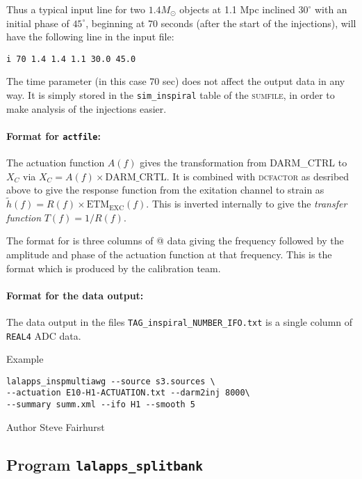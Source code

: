 \begin{entry}
Thus a typical input line for two $1.4M_\odot$ objects at 1.1 Mpc
inclined $30^\circ$ with an initial phase of $45^\circ$, beginning at
70 seconds (after the start of the injections), will have the following line in the input
file:
\begin{verbatim}
i 70 1.4 1.4 1.1 30.0 45.0
\end{verbatim}
The time parameter (in this case 70 sec) does not affect the output data in any
way.  It is simply stored in the \texttt{sim\_inspiral} table of the
\textsc{sumfile}, in order to make analysis of the injections easier.

\paragraph{Format for \texttt{actfile}:} The actuation function $A(f)$
gives the transformation from DARM\_CTRL to $X_{C}$ via $X_{C} = A(f) 
\times \mathrm{DARM}\_\mathrm{CRTL}$.   It is combined with
\textsc{dcfactor} as desribed above to give the response function from
the exitation channel to strain as
$\tilde{h}(f)=R(f) \times \mathrm{ETM}_\mathrm{EXC}(f)$.  This is inverted internally 
to give the \emph{transfer function} $T(f)=1/R(f)$. 

The format for \verb@actfile@ is three columns of @ data giving the 
frequency followed by the amplitude and phase of the actuation function
at that frequency.  This is the format which is produced by the
calibration team.

\paragraph{Format for the data output:} The data output in the files
\verb$TAG_inspiral_NUMBER_IFO.txt$ is a single column of \verb$REAL4$ ADC data.

\item[Example]
\begin{verbatim}
lalapps_inspmultiawg --source s3.sources \
--actuation E10-H1-ACTUATION.txt --darm2inj 8000\ 
--summary summ.xml --ifo H1 --smooth 5
\end{verbatim}

\item[Author] 
Steve Fairhurst
\end{entry}
\clearpage


\subsection{Program \texttt{lalapps\_splitbank}}
\label{program:lalapps-splitbank}
\idx[Program]{lalapps\_splitbank}


